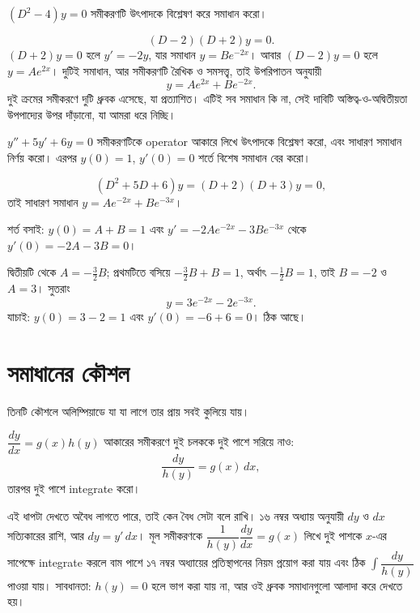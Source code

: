 \documentclass[11pt]{article}
\begin{document}
\begin{example}
$\left( D^{2} - 4 \right)y = 0$ সমীকরণটি উৎপাদকে বিশ্লেষণ করে সমাধান করো।
\end{example}

\begin{solbox}
\[
  \left( D-2 \right)\left( D+2 \right)y = 0 .
\]
$(D+2)y = 0$ হলে $y' = -2y$, যার সমাধান $y = Be^{-2x}$। আবার
$(D-2)y = 0$ হলে $y = Ae^{2x}$। দুটিই সমাধান, আর সমীকরণটি রৈখিক ও সমসত্ত্ব,
তাই উপরিপাতন অনুযায়ী
\[
  y = Ae^{2x} + Be^{-2x} .
\]
দুই ক্রমের সমীকরণে দুটি ধ্রুবক এসেছে, যা প্রত্যাশিত। এটিই সব সমাধান কি না,
সেই দাবিটি অস্তিত্ব-ও-অদ্বিতীয়তা উপপাদ্যের উপর দাঁড়ানো, যা আমরা ধরে নিচ্ছি।
\end{solbox}

 $y'' + 5y' + 6y = 0$ সমীকরণটিকে operator আকারে লিখে উৎপাদকে বিশ্লেষণ
করো, এবং সাধারণ সমাধান নির্ণয় করো। এরপর $y(0) = 1$, $y'(0) = 0$ শর্তে বিশেষ
সমাধান বের করো।

\begin{sol}
\[
  \left( D^{2}+5D+6 \right)y = \left( D+2 \right)\left( D+3 \right)y = 0 ,
\]
তাই সাধারণ সমাধান $y = Ae^{-2x} + Be^{-3x}$।

শর্ত বসাই: $y(0) = A + B = 1$ এবং $y' = -2Ae^{-2x} - 3Be^{-3x}$ থেকে
$y'(0) = -2A - 3B = 0$।

দ্বিতীয়টি থেকে $A = -\tfrac{3}{2}B$; প্রথমটিতে বসিয়ে
$-\tfrac{3}{2}B + B = 1$, অর্থাৎ $-\tfrac{1}{2}B = 1$, তাই $B = -2$ ও
$A = 3$। সুতরাং
\[
  y = 3e^{-2x} - 2e^{-3x} .
\]
যাচাই: $y(0) = 3-2 = 1$ এবং $y'(0) = -6+6 = 0$। ঠিক আছে।
\end{sol}

\section{সমাধানের কৌশল}

তিনটি কৌশলে অলিম্পিয়াডে যা যা লাগে তার প্রায় সবই কুলিয়ে যায়।

\begin{idea}
$\dfrac{dy}{dx} = g(x)h(y)$ আকারের সমীকরণে দুই চলককে দুই পাশে সরিয়ে নাও:
\[
  \frac{dy}{h(y)} = g(x)\,dx ,
\]
তারপর দুই পাশে integrate করো।
\end{idea}

এই ধাপটা দেখতে অবৈধ লাগতে পারে, তাই কেন বৈধ সেটা বলে রাখি। ১৬ নম্বর
অধ্যায় অনুযায়ী $dy$ ও $dx$ সত্যিকারের রাশি, আর $dy = y'\,dx$। মূল
সমীকরণকে $\dfrac{1}{h(y)}\dfrac{dy}{dx} = g(x)$ লিখে দুই পাশকে $x$-এর সাপেক্ষে
integrate করলে বাম পাশে ১৭ নম্বর অধ্যায়ের প্রতিস্থাপনের নিয়ম প্রয়োগ করা
যায় এবং ঠিক $\int \dfrac{dy}{h(y)}$ পাওয়া যায়। সাবধানতা: $h(y) = 0$ হলে ভাগ
করা যায় না, আর ওই ধ্রুবক সমাধানগুলো আলাদা করে দেখতে হয়।
\end{document}
